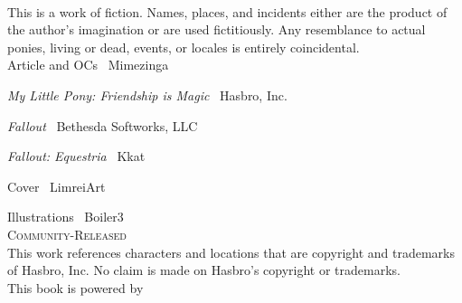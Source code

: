 \newpage

~\vfill

\thispagestyle{empty}

\noindent This is a work of fiction. Names, places, and incidents either are the product of the author's imagination or are used fictitiously. Any resemblance to actual ponies, living or dead, events, or locales is entirely coincidental.\\

\noindent Article and OCs \textcopyright\ Mimezinga

\noindent \emph{My Little Pony: Friendship is Magic} \textcopyright\ Hasbro, Inc.

\noindent \emph{Fallout} \textcopyright\ Bethesda Softworks, LLC

\noindent \emph{Fallout: Equestria} \textcopyright\ Kkat

\noindent Cover \textcopyright\ LimreiArt

\noindent Illustrations \textcopyright\ Boiler3 \\

\noindent \textsc{Community-Released}\\

\noindent This work references characters and locations that are copyright and trademarks of Hasbro, Inc. No claim is made on Hasbro's copyright or trademarks.\\

\noindent This book is powered by \XeLaTeX{}

